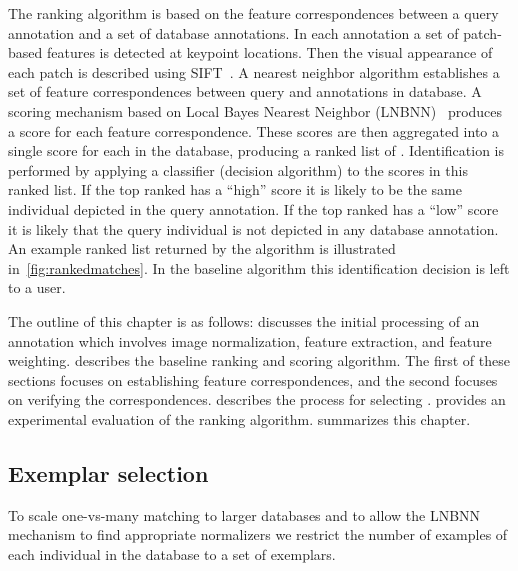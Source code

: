     The ranking algorithm is based on the feature correspondences between a
      query annotation and a set of database annotations.
    In each annotation a set of patch-based features is detected at keypoint
      locations.
    Then the visual appearance of each patch is described using
      SIFT~\cite{lowe_distinctive_2004}.
    A nearest neighbor algorithm establishes a set of feature correspondences
      between query and annotations in database.
    A scoring mechanism based on Local \Naive{} Bayes Nearest Neighbor
      (LNBNN)~\cite{mccann_local_2012} produces a score for each feature
      correspondence.
    These scores are then aggregated into a single score for each \name{} in
      the database, producing a ranked list of \names{}.
    Identification is performed by applying a classifier (decision algorithm)
      to the scores in this ranked list.
    If the top ranked \name{} has a ``high'' score it is likely to be the same
      individual depicted in the query annotation.
    If the top ranked \name{} has a ``low'' score it is likely that the query
      individual is not depicted in any database annotation.
    An example ranked list returned by the algorithm is illustrated
      in~\cref{fig:rankedmatches}.
    In the baseline algorithm this identification decision is left to a user.

    The outline of this chapter is as follows:
     discusses the initial processing of an annotation
      which involves image normalization, feature extraction, and feature
      weighting.
     describes the baseline ranking and
      scoring algorithm.
    The first of these sections focuses on establishing feature
      correspondences, and the second focuses on verifying the correspondences.
     describes the process for selecting \exemplars{}.
     provides an experimental evaluation of the ranking
      algorithm.
     summarizes this chapter.

    \rankedmatches{}



\subsection{Exemplar selection}\label{sec:exempselect}
    To scale one-vs-many matching to larger databases and to allow the LNBNN
    mechanism to find appropriate normalizers we restrict the number of
    examples of each individual in the database to a set of exemplars.

